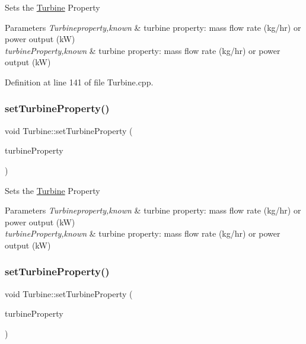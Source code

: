 Sets the \hyperlink{class_turbine}{Turbine} Property


\begin{DoxyParams}{Parameters}
{\em Turbineproperty,known} & turbine property\+: mass flow rate (kg/hr) or power output (kW) \\
\hline
{\em turbine\+Property,known} & turbine property\+: mass flow rate (kg/hr) or power output (kW) \\
\hline
\end{DoxyParams}


Definition at line 141 of file Turbine.\+cpp.

\mbox{\label{class_turbine_abb3f16cefe52f4e9c7b32b2bb17a68ee}} 
\subsubsection{\texorpdfstring{set\+Turbine\+Property()}{setTurbineProperty()}\hspace{0.1cm}{\footnotesize\ttfamily [2/3]}}
{\footnotesize\ttfamily void Turbine\+::set\+Turbine\+Property (\begin{DoxyParamCaption}\item[{\hyperlink{class_turbine_a5db4f65cf2539e3837684d53221ade12}{Turbine\+Property}}]{turbine\+Property }\end{DoxyParamCaption})}

Sets the \hyperlink{class_turbine}{Turbine} Property


\begin{DoxyParams}{Parameters}
{\em Turbineproperty,known} & turbine property\+: mass flow rate (kg/hr) or power output (kW) \\
\hline
{\em turbine\+Property,known} & turbine property\+: mass flow rate (kg/hr) or power output (kW) \\
\hline
\end{DoxyParams}
\mbox{\label{class_turbine_abb3f16cefe52f4e9c7b32b2bb17a68ee}} 
\subsubsection{\texorpdfstring{set\+Turbine\+Property()}{setTurbineProperty()}\hspace{0.1cm}{\footnotesize\ttfamily [3/3]}}
{\footnotesize\ttfamily void Turbine\+::set\+Turbine\+Property (\begin{DoxyParamCaption}\item[{\hyperlink{class_turbine_a5db4f65cf2539e3837684d53221ade12}{Turbine\+Property}}]{turbine\+Property }\end{DoxyParamCaption})}

